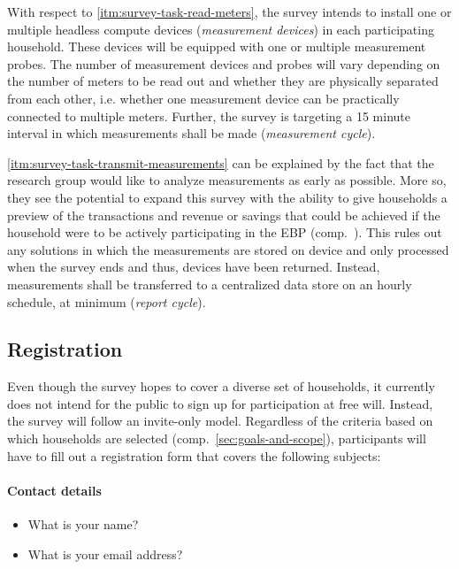 With respect to \ref{itm:survey-task-read-meters}, the survey intends to install one or multiple headless compute devices (\textit{measurement devices}) in each participating household. These devices will be equipped with one or multiple measurement probes. The number of measurement devices and probes will vary depending on the number of meters to be read out and whether they are physically separated from each other, i.e. whether one measurement device can be practically connected to multiple meters. Further, the survey is targeting a 15 minute interval in which measurements shall be made (\textit{measurement cycle}).

\ref{itm:survey-task-transmit-measurements} can be explained by the fact that the research group would like to analyze measurements as early as possible. More so, they see the potential to expand this survey with the ability to give households a preview of the transactions and revenue or savings that could be achieved if the household were to be actively participating in the \ac{EBP} (comp.~\cite{stoy2019broker}). This rules out any solutions in which the measurements are stored on device and only processed when the survey ends and thus, devices have been returned. Instead, measurements shall be transferred to a centralized data store on an hourly schedule, at minimum (\textit{report cycle}).


\subsection{Registration}
\label{sec:survey-registration}

Even though the survey hopes to cover a diverse set of households, it currently does not intend for the public to sign up for participation at free will. Instead, the survey will follow an invite-only model. Regardless of the criteria based on which households are selected (comp.~\autoref{sec:goals-and-scope}), participants will have to fill out a registration form that covers the following subjects:

\paragraph{Contact details}
\begin{itemize}
  \item What is your name?
  \item What is your email address?
\end{itemize}

